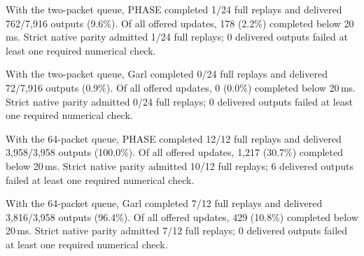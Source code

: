 With the two-packet queue, PHASE completed 1/24 full replays and delivered 762/7,916 outputs (9.6\%). Of all offered updates, 178 (2.2\%) completed below 20\,ms. Strict native parity admitted 1/24 full replays; 0 delivered outputs failed at least one required numerical check.

With the two-packet queue, Garl completed 0/24 full replays and delivered 72/7,916 outputs (0.9\%). Of all offered updates, 0 (0.0\%) completed below 20\,ms. Strict native parity admitted 0/24 full replays; 0 delivered outputs failed at least one required numerical check.

With the 64-packet queue, PHASE completed 12/12 full replays and delivered 3,958/3,958 outputs (100.0\%). Of all offered updates, 1,217 (30.7\%) completed below 20\,ms. Strict native parity admitted 10/12 full replays; 6 delivered outputs failed at least one required numerical check.

With the 64-packet queue, Garl completed 7/12 full replays and delivered 3,816/3,958 outputs (96.4\%). Of all offered updates, 429 (10.8\%) completed below 20\,ms. Strict native parity admitted 7/12 full replays; 0 delivered outputs failed at least one required numerical check.
